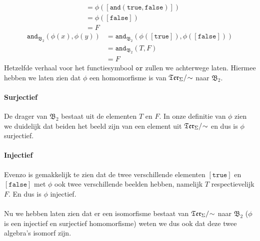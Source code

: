 \documentclass[a4paper,11pt]{article}
\begin{document}
\begin{description}
\begin{align*}
                                                       &= \phi([\texttt{and}(\texttt{true},\texttt{false})]) \\
                                                       &= \phi([\texttt{false}]) \\
                                                       &= F
\end{align*}
\begin{align*}
\texttt{and}_{\mathfrak{B}_{2}}(\phi(x),\phi(y)) &= \texttt{and}_{\mathfrak{B}_{2}}(\phi([\texttt{true}]),\phi([\texttt{false}])) \\
                                                 &= \texttt{and}_{\mathfrak{B}_{2}}(T,F) \\
                                                 &= F
\end{align*}
Hetzelfde verhaal voor het functiesymbool $\texttt{or}$ zullen we achterwege
laten. Hiermee hebben we laten zien dat $\phi$ een homomorfisme is van
$\mathfrak{Ter}_{\Sigma}/\negmedspace\sim$ naar $\mathfrak{B}_{2}$.

\paragraph{Surjectief}

De drager van $\mathfrak{B}_{2}$ bestaat uit de elementen $T$ en $F$. In onze
definitie van $\phi$ zien we duidelijk dat beiden het beeld zijn van een
element uit $\mathfrak{Ter}_{\Sigma}/\negmedspace\sim$ en dus is $\phi$ surjectief.

\paragraph{Injectief}

Evenzo is gemakkelijk te zien dat de twee verschillende elementen
$[\texttt{true}]$ en $[\texttt{false}]$ met $\phi$ ook twee verschillende
beelden hebben, namelijk $T$ respectievelijk $F$. En dus is $\phi$ injectief.

\paragraph{}

Nu we hebben laten zien dat er een isomorfisme bestaat van
$\mathfrak{Ter}_{\Sigma}/\negmedspace\sim$ naar $\mathfrak{B}_{2}$ ($\phi$ is een
injectief en surjectief homomorfisme) weten we dus ook dat deze twee algebra's
isomorf zijn.

\end{description}
\end{document}
